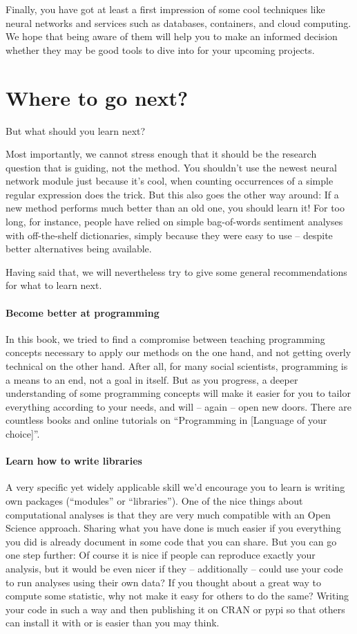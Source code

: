 Finally, you have got at least a first impression of some cool techniques like neural networks and services such as databases, containers, and cloud computing. We hope that being aware of them will help you to make an informed decision whether they may be good tools to dive into for your upcoming projects.



\section{Where to go next?}
But what should you learn next?

Most importantly, we cannot stress enough that it should be the research question that is guiding, not the method. You shouldn't use the newest neural network module just because it's cool, when counting occurrences of a simple regular expression does the trick. But this also goes the other way around: If a new method performs much better than an old one, you should learn it! For too long, for instance, people have relied on simple bag-of-words sentiment analyses with off-the-shelf dictionaries, simply because they were easy to use -- despite better alternatives being available.

Having said that, we will nevertheless try to give some general recommendations for what to learn next.

\paragraph{Become better at programming} In this book, we tried to find a compromise between teaching programming concepts necessary to apply our methods on the one hand, and not getting overly technical on the other hand. After all, for many social scientists, programming is a means to an end, not a goal in itself. But as you progress, a deeper understanding of some programming concepts will make it easier for you to tailor everything according to your needs, and will -- again -- open new doors. There are countless books and online tutorials on ``Programming in [Language of your choice]''.


\paragraph{Learn how to write libraries} A very specific yet widely applicable skill we'd encourage you to learn is writing own packages (``modules'' or ``libraries''). One of the nice things about computational analyses is that they are very much compatible with an Open Science approach. Sharing what you have done is much easier if you everything you did is already document in some code that you can share. But you can go one step further: Of course it is nice if people can reproduce exactly your analysis, but it would be even nicer if they -- additionally -- could use your code to run analyses using their own data? If you thought about a great way to compute some statistic, why not make it easy for others to do the same? Writing your code in such a way and then publishing it on CRAN or pypi so that others can install it with  or  is easier than you may think.


